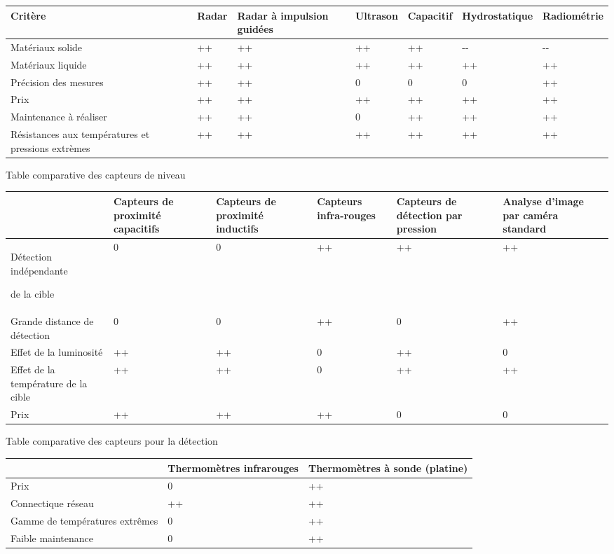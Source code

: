 \documentclass{mise_en_page}
\begin{document}
\begin{flushleft}
\tablehead{}
\begin{supertabular}{|m{2.71cm}|m{1.308cm}|m{2.155cm}|m{1.8109999cm}|m{1.8369999cm}|m{2.816cm}|m{2.472cm}|}
\hline
Critère &
Radar &
Radar à impulsion guidées &
Ultrason &
Capacitif &
Hydrostatique &
Radiométrie\\\hline
Matériaux solide &
++ &
++ &
++ &
++ &
{}-{}- &
{}-{}-\\\hline
Matériaux liquide &
++ &
++ &
++ &
++ &
++ &
++\\\hline
Précision des mesures &
++ &
++ &
0 &
0 &
0 &
++\\\hline
Prix &
++ &
++ &
++ &
++ &
++ &
++\\\hline
Maintenance à réaliser &
++ &
++ &
0 &
++ &
++ &
++\\\hline
Résistances aux températures et pressions extrèmes &
++ &
++ &
++ &
++ &
++ &
++\\\hline
\end{supertabular}
\end{flushleft}



Table comparative des capteurs de niveau




\begin{flushleft}
\tablehead{}
\begin{supertabular}{|m{2.843cm}|m{2.261cm}|m{2.552cm}|m{2.552cm}|m{2.552cm}|m{2.552cm}|}
\hline
~
 &
Capteurs de proximité capacitifs &
Capteurs de proximité inductifs &
Capteurs infra-rouges &
Capteurs de détection par pression &
Analyse d’image par caméra standard\\\hline
Détection indépendante 

 de la cible &
0 &
0 &
++ &
++ &
++\\\hline
Grande distance de détection  &
0 &
0 &
++ &
0 &
++\\\hline
Effet de la luminosité &
++ &
++ &
0 &
++ &
0\\\hline
Effet de la température de la cible &
++ &
++ &
0 &
++ &
++\\\hline
Prix &
++ &
++ &
++ &
0 &
0\\\hline
\end{supertabular}
\end{flushleft}



Table comparative des capteurs pour la détection




\begin{flushleft}
\tablehead{}
\begin{supertabular}{|m{5.303cm}|m{5.303cm}|m{5.303cm}|}
\hline
~
 &
Thermomètres infrarouges &
Thermomètres à sonde (platine)\\\hline
Prix &
0 &
++\\\hline
Connectique réseau &
++ &
++\\\hline
Gamme de températures extrêmes &
0 &
++\\\hline
Faible maintenance &
0 &
++\\\hline
\end{supertabular}
\end{flushleft}
\end{document}
